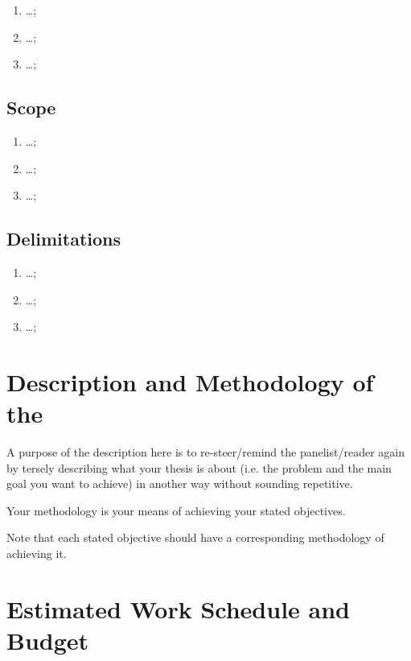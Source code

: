 \begin{enumerate}
	\item \ldots;
	
	\item \ldots;
	
	\item \ldots;	
\end{enumerate}

\subsection{Scope}
\begin{enumerate}
	\item \ldots;
	
	\item \ldots;
	
	\item \ldots;	
\end{enumerate}

\subsection{Delimitations}
\begin{enumerate}
	\item \ldots;
	
	\item \ldots;
	
	\item \ldots;	
\end{enumerate}

\section{Description and Methodology of the \documentType}

A purpose of the description here is to re-steer/remind the panelist/reader again by tersely describing what your thesis is about (i.e. the problem and the main goal you want to achieve) in another way without sounding repetitive. 

Your methodology is your means of achieving your stated objectives.

Note that each stated objective should have a corresponding methodology of achieving it.

\graytx{\blindtext}


\ifFinished
\else

\section{Estimated Work Schedule and Budget}

